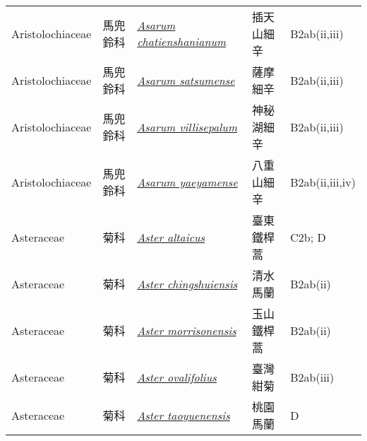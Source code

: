 {\begin{longtable}{L{2.5cm}L{2cm}L{5cm}L{2.5cm}L{3cm}}
    Aristolochiaceae & 馬兜鈴科 & \href{http://www.theplantlist.org/tpl1.1/search?q=Asarum+chatienshanianum}{\textit{Asarum chatienshanianum} } & 插天山細辛 & B2ab(ii,iii)    \\
    Aristolochiaceae & 馬兜鈴科 & \href{http://www.theplantlist.org/tpl1.1/search?q=Asarum+satsumense}{\textit{Asarum satsumense} } & 薩摩細辛 & B2ab(ii,iii)    \\
    Aristolochiaceae & 馬兜鈴科 & \href{http://www.theplantlist.org/tpl1.1/search?q=Asarum+villisepalum}{\textit{Asarum villisepalum} } & 神秘湖細辛 & B2ab(ii,iii)    \\
    Aristolochiaceae & 馬兜鈴科 & \href{http://www.theplantlist.org/tpl1.1/search?q=Asarum+yaeyamense}{\textit{Asarum yaeyamense} } & 八重山細辛 & B2ab(ii,iii,iv)    \\
    Asteraceae & 菊科 & \href{http://www.theplantlist.org/tpl1.1/search?q=Aster+altaicus}{\textit{Aster altaicus} } & 臺東鐵桿蒿 & C2b; D    \\
    Asteraceae & 菊科 & \href{http://www.theplantlist.org/tpl1.1/search?q=Aster+chingshuiensis}{\textit{Aster chingshuiensis} } & 清水馬蘭 & B2ab(ii)    \\
    Asteraceae & 菊科 & \href{http://www.theplantlist.org/tpl1.1/search?q=Aster+morrisonensis}{\textit{Aster morrisonensis} } & 玉山鐵桿蒿 & B2ab(ii)    \\
    Asteraceae & 菊科 & \href{http://www.theplantlist.org/tpl1.1/search?q=Aster+ovalifolius}{\textit{Aster ovalifolius} } & 臺灣紺菊 & B2ab(iii)    \\
    Asteraceae & 菊科 & \href{http://www.theplantlist.org/tpl1.1/search?q=Aster+taoyuenensis}{\textit{Aster taoyuenensis} } & 桃園馬蘭 & D    \\

\end{longtable}}
